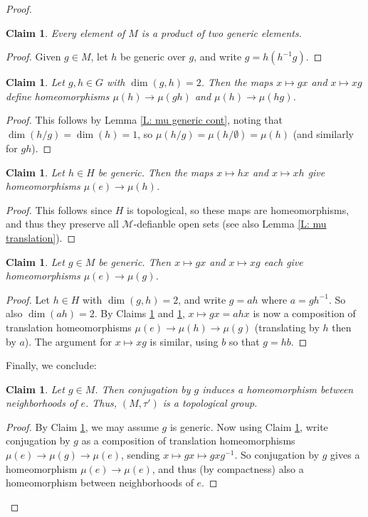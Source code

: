 \documentclass{amsart}
\newtheorem{claim}[theorem]{Claim}
\theoremstyle{definition}
\begin{document}
\begin{proof}
    \begin{claim}\label{C: product of two generics} Every element of $M$ is a product of two generic elements.
    \end{claim}
    \begin{proof}
        Given $g\in M$, let $h$ be generic over $g$, and write $g=h(h^{-1}g)$.
        \end{proof}
    \begin{claim}\label{C: translation of mus}
        Let $g,h\in G$ with $\dim(g,h)=2$. Then the maps $x\mapsto gx$ and $x\mapsto xg$ define homeomorphisms $\mu(h)\rightarrow\mu(gh)$ and $\mu(h)\rightarrow\mu(hg)$. \end{claim}
        \begin{proof} This follows by Lemma \ref{L: mu generic cont}, noting that $\dim(h/g)=\dim(h)=1$, so $\mu(h/g)=\mu(h/\emptyset)=\mu(h)$ (and similarly for $gh$).
        \end{proof}
    \begin{claim}\label{C: local translation of mus} Let $h\in H$ be generic. Then the maps $x\mapsto hx$ and $x\mapsto xh$ give homeomorphisms $\mu(e)\rightarrow\mu(h)$.
    \end{claim}
            \begin{proof}
                This follows since $H$ is topological, so these maps are homeomorphisms, and thus they preserve all $\mathcal M$-defianble open sets (see also Lemma \ref{L: mu translation}).
            \end{proof}
    \begin{claim}\label{C: local generic mu trans}
        Let $g\in M$ be generic. Then $x\mapsto gx$ and $x\mapsto xg$ each give homeomorphisms $\mu(e)\rightarrow\mu(g)$.
    \end{claim}
    \begin{proof}
        Let $h\in H$ with $\dim(g,h)=2$, and write $g=ah$ where $a=gh^{-1}$. So also $\dim(ah)=2$. By Claims \ref{C: local translation of mus} and \ref{C: translation of mus}, $x\mapsto gx=ahx$ is now a composition of translation homeomorphisms $\mu(e)\rightarrow\mu(h)\rightarrow\mu(g)$ (translating by $h$ then by $a$). The argument for $x\mapsto xg$ is similar, using $b$ so that $g=hb$.
    \end{proof}
            
    Finally, we conclude:
    \begin{claim}
        Let $g\in M$. Then conjugation by $g$ induces a homeomorphism between neighborhoods of $e$. Thus, $(M,\tau')$ is a topological group. 
    \end{claim}
    \begin{proof}
        By Claim \ref{C: product of two generics}, we may assume $g$ is generic. Now using Claim \ref{C: local generic mu trans}, write conjugation by $g$ as a composition of translation homeomorphisms $\mu(e)\rightarrow\mu(g)\rightarrow\mu(e)$, sending $x\mapsto gx\mapsto gxg^{-1}$. So conjugation by $g$ gives a homeomorphism $\mu(e)\rightarrow\mu(e)$, and thus (by compactness) also a homeomorphism between neighborhoods of $e$.
    \end{proof}


\end{proof}
\end{document}
